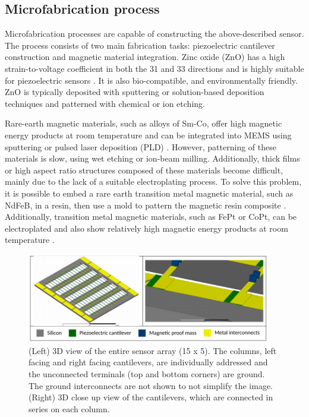 \subsection{Microfabrication process}
Microfabrication processes are capable of constructing the above-described sensor. The process consists of two main fabrication tasks: piezoelectric cantilever construction and magnetic material integration. Zinc oxide (ZnO) has a high strain-to-voltage coefficient in both the 31 and 33 directions and is highly suitable for piezoelectric sensors \cite{tadigadapa2009piezoelectric}. It is also bio-compatible, and environmentally friendly. ZnO is typically deposited with sputtering or solution-based deposition techniques \cite{znaidi2010sol} and patterned with chemical or ion etching.

Rare-earth magnetic materials, such as alloys of Sm-Co, offer high magnetic energy products at room temperature and can be integrated into MEMS using sputtering or pulsed laser deposition (PLD)  \cite{arnold2009permanent}. However, patterning of these materials is slow, using wet etching or ion-beam milling. Additionally, thick films or high aspect ratio structures composed of these materials become difficult, mainly due to the lack of a suitable electroplating process. To solve this problem, it is possible to embed a rare earth transition metal magnetic material, such as NdFeB, in a resin, then use a mold to pattern the magnetic resin composite \cite{wang2013resin}. Additionally, transition metal magnetic materials, such as FePt or CoPt, can be electroplated and also show relatively high magnetic energy products at room temperature \cite{arnold2009permanent,chin2000permanent}.


\begin{figure}[H]
\centering
\includegraphics[width=0.95\textwidth]{yoon_3d}
\caption{(Left) 3D view of the entire sensor array (15 x 5). The columns, left facing and right facing cantilevers, are individually addressed and the unconnected terminals (top and bottom corners) are ground. The ground interconnects are not shown to not simplify the image. (Right) 3D close up view of the cantilevers, which are connected in series on each column.}
\label{fig:yoon_3d}
\end{figure}


